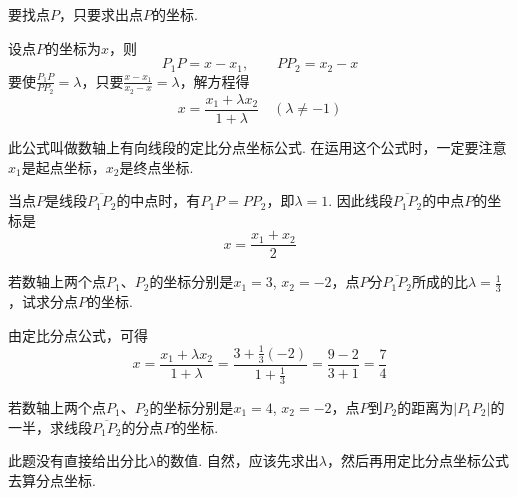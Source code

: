 \begin{analyze}
    要找点$P$，只要求出点$P$的坐标.
\end{analyze}

\begin{solution}
设点$P$的坐标为$x$，则
\[P_1P=x-x_1,\qquad PP_2=x_2-x\]
要使$\frac{P_1P}{PP_2}=\lambda$，只要$\frac{x-x_1}{x_2-x}=\lambda$，解方程得
\[x=\frac{x_1+\lambda x_2}{1+\lambda}\quad (\lambda\ne -1)\]
\end{solution}

此公式叫做数轴上有向线段的定比分点坐标公式. 在运用这个公式时，一定要注意$x_1$是起点坐标，$x_2$是终点坐标.

当点$P$是线段$\overline{P_1P_2}$的中点时，有$P_1P=PP_2$，即$\lambda=1$. 因此线段$\overline{P_1P_2}$的中点$P$的坐标是
\[x=\frac{x_1+x_2}{2}\] 

\begin{example}
    若数轴上两个点$P_1$、$P_2$的坐标分别是$x_1=3$, $x_2=-2$，点$P$分$\overline{P_1P_2}$所成的比$\lambda=\frac{1}{3}$，试求分点$P$的坐标.
\end{example}

\begin{solution}
    由定比分点公式，可得
\[x=\frac{x_1+\lambda x_2}{1+\lambda}=\frac{3+\frac{1}{3}(-2)}{1+\frac{1}{3}}=\frac{9-2}{3+1}=\frac{7}{4}\]
\end{solution}

\begin{example}
若数轴上两个点$P_1$、$P_2$的坐标分别是$x_1=4$, $x_2=-2$，点$P$到$P_2$的距离为$|P_1P_2|$的一半，求线段$\overline{P_1P_2}$的分点$P$的坐标.
\end{example}

\begin{analyze}
    此题没有直接给出分比$\lambda$的数值. 自然，应该先求出$\lambda$，然后再用定比分点坐标公式去算分点坐标.
\end{analyze}

